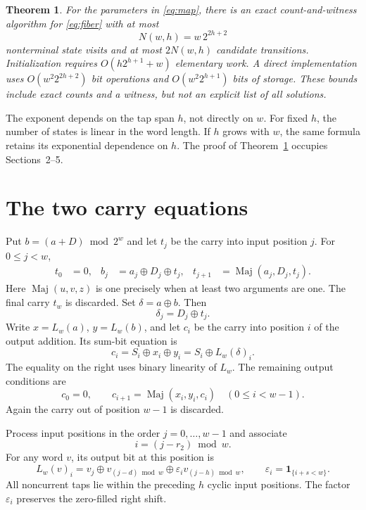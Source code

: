 \documentclass[11pt,a4paper]{article}
\newtheorem{theorem}{Theorem}
\theoremstyle{definition}\newtheorem{definition}[theorem]{Definition}
\newcommand{\maj}{\operatorname{Maj}}
\begin{document}
\begin{theorem}\label{thm:main}
For the parameters in \eqref{eq:map}, there is an exact count-and-witness algorithm
for \eqref{eq:fiber} with at most
\begin{equation}\label{eq:bound}
 N(w,h)=w\,2^{2h+2}
\end{equation}
nonterminal state visits and at most $2N(w,h)$ candidate transitions.
Initialization requires $O(h2^{h+1}+w)$ elementary work. A direct implementation
uses $O(w^2 2^{2h+2})$ bit operations and $O(w^2 2^{h+1})$ bits of storage.
These bounds include exact counts and a witness, but not an explicit list of all solutions.
\end{theorem}

The exponent depends on the tap span $h$, not directly on $w$.
For fixed $h$, the number of states is linear in the word length.
If $h$ grows with $w$, the same formula retains its exponential dependence on $h$.
The proof of Theorem~\ref{thm:main} occupies Sections~2--5.

\section{The two carry equations}
Put $b=(a+D)\bmod 2^w$ and let $t_j$ be the carry into input position $j$.
For $0\leq j<w$,
\begin{align}
 t_0&=0, & b_j&=a_j\oplus D_j\oplus t_j,
 &t_{j+1}&=\maj(a_j,D_j,t_j).\label{eq:input}
\end{align}
Here $\maj(u,v,z)$ is one precisely when at least two arguments are one.
The final carry $t_w$ is discarded. Set $\delta=a\oplus b$. Then
\begin{equation}\label{eq:delta}
 \delta_j=D_j\oplus t_j.
\end{equation}
Write $x=L_w(a)$, $y=L_w(b)$, and let $c_i$ be the carry into position $i$
of the output addition. Its sum-bit equation is
\begin{equation}\label{eq:outputcarry}
 c_i=S_i\oplus x_i\oplus y_i
     =S_i\oplus L_w(\delta)_i.
\end{equation}
The equality on the right uses binary linearity of $L_w$.
The remaining output conditions are
\begin{equation}\label{eq:output}
 c_0=0,\qquad c_{i+1}=\maj(x_i,y_i,c_i)\quad(0\leq i<w-1).
\end{equation}
Again the carry out of position $w-1$ is discarded.

Process input positions in the order $j=0,\ldots,w-1$ and associate
\begin{equation}\label{eq:index}
 i=(j-r_2)\bmod w.
\end{equation}
For any word $v$, its output bit at this position is
\begin{equation}\label{eq:taps}
 L_w(v)_i=v_j\oplus v_{(j-d)\bmod w}
       \oplus \varepsilon_i v_{(j-h)\bmod w},\qquad
 \varepsilon_i=\mathbf 1_{\{i+s<w\}}.
\end{equation}
All noncurrent taps lie within the preceding $h$ cyclic input positions.
The factor $\varepsilon_i$ preserves the zero-filled right shift.
\end{document}
